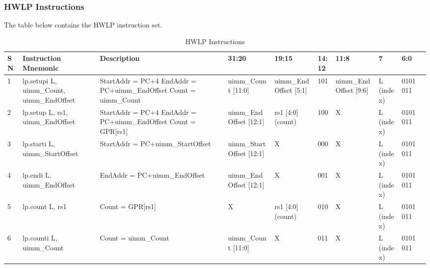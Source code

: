 \documentclass[main\_\_EN.tex]{subfiles}
\begin{document}
\clearpage
\begin{landscape}

\subsubsection{HWLP Instructions}
\label{sec:riscvcpu-hwloop-instr}
The table below contains the HWLP instruction set.

\begin{table}[H]
    \caption{HWLP Instructions}
    \label{tab:riscvcpu-hwlp-instr}
    \begin{tabular}{|p{0.3cm}|p{2.5cm}|p{6cm}|p{2.5cm}|p{2.5cm}|p{1cm}|p{2.5cm}|p{2cm}|p{2cm}|p{2cm}|}
        \hline\rowcolor{lightgray}
        \textbf{SN} & \textbf{Instruction Mnemonic} & \textbf{Description} & \textbf{31:20} & \textbf{19:15} & \textbf{14:12}  & \textbf{11:8} & \textbf{7} & \textbf{6:0} \\
        \hline
        1 & lp.setupi L, uimm\_Count, uimm\_EndOffset & StartAddr = PC+4 \newline EndAddr = PC+uimm\_EndOffset \newline Count = uimm\_Count & uimm\_Count [11:0] & uimm\_EndOffset [5:1] &  101 & uimm\_EndOffset [9:6] & L (index) & 0101011\\
        \hline
        2 & lp.setup L, rs1, uimm\_EndOffset & StartAddr = PC+4 \newline EndAddr = PC+uimm\_EndOffset \newline Count = GPR[rs1] & uimm\_EndOffset [12:1]  & rs1 [4:0] (count) & 100 & X & L (index) & 0101011 \\
        \hline
        3 & lp.starti L, uimm\_StartOffset & StartAddr = PC+uimm\_StartOffset  & uimm\_StartOffset [12:1] & X & 000 & X & L (index) & 0101011 \\
        \hline
        4 & lp.endi L, uimm\_EndOffset & EndAddr = PC+uimm\_EndOffset & uimm\_EndOffset [12:1] & X & 001 & X & L (index) & 0101011\\
        \hline
        5 & lp.count L, rs1 & Count = GPR[rs1] & X & rs1 [4:0] (count) & 010 & X & L (index) & 0101011\\
        \hline
        6 & lp.counti L, uimm\_Count & Count = uimm\_Count & uimm\_Count [11:0] & X & 011 & X & L (index) & 0101011\\
        \hline
    \end{tabular}
\end{table}

\end{landscape}
\restoregeometry
\clearpage
\end{document}
